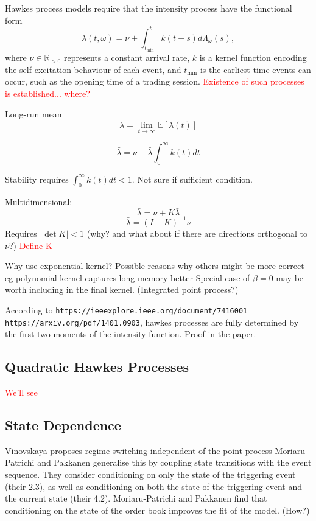 \documentclass[honours,12pt]{unswthesis}
\numberwithin{equation}{section}
\begin{document}
Hawkes process models require that the intensity process have the functional form
$$\lambda(t,\omega) = \nu + \int_{t_\mathrm{\min}}^t k(t-s)d\Lambda_\omega(s),$$
where $\nu\in\mathbb{R}_{>0}$ represents a constant arrival rate, $k$ is a kernel function encoding the self-excitation behaviour of each event, and $t_\mathrm{\min}$ is the earliest time events can occur, such as the opening time of a trading session.
\textcolor{red}{Existence of such processes is established... where?}

Long-run mean $$\overline\lambda = \lim_{t\to\infty} \mathbb E\left[\lambda(t)\right]$$

$$\bar\lambda = \nu + \bar\lambda \int_0^\infty k(t)dt$$

Stability requires $\int_0^\infty k(t)dt < 1$. Not sure if sufficient condition.

Multidimensional:
$$\bar\lambda = \nu + K \bar\lambda$$
$$\bar\lambda = (I-K)^{-1}\nu$$
Requires $\vert\det K\vert < 1$ (why? and what about if there are directions orthogonal to $\nu$?)
\textcolor{red}{Define K}

Why use exponential kernel? Possible reasons why others might be more correct eg polynomial kernel captures long memory better
Special case of $\beta=0$ may be worth including in the final kernel. (Integrated point process?)

According to \texttt{https://ieeexplore.ieee.org/document/7416001 https://arxiv.org/pdf/1401.0903}, hawkes processes are fully determined by the first two moments of the intensity function. Proof in the paper.

\subsection{Quadratic Hawkes Processes}
\textcolor{red}{We'll see}

\subsection{State Dependence}
Vinovskaya proposes regime-switching independent of the point process
Moriaru-Patrichi and Pakkanen generalise this by coupling state transitions with the event sequence. They consider conditioning on only the state of the triggering event (their 2.3), as well as conditioning on both the state of the triggering event and the current state (their 4.2).
Moriaru-Patrichi and Pakkanen find that conditioning on the state of the order book improves the fit of the model. (How?)
\end{document}
